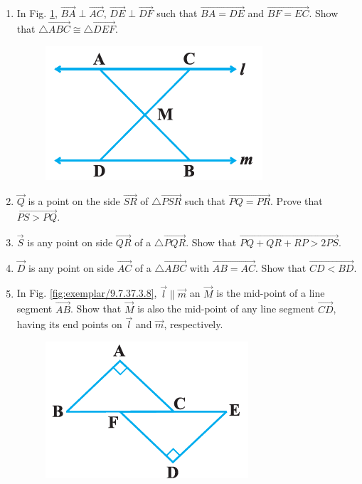 \begin{enumerate}[label=\arabic*.,ref=\thesubsection.\theenumi]
\begin{figure}[h]
\end{figure}
\item In Fig. \ref{fig:exemplar/9.7.37.3.4}, $\vec{BA} \perp \vec{AC}$, $\vec{DE} \perp \vec{DF}$ such that $\vec{BA=DE}$ and $\vec{BF=EC}$. Show that $\triangle \vec{ABC} \cong \triangle \vec{DEF}$.
\begin{figure}[h]
	\centering
	\includegraphics[width=\columnwidth]{chapters/exemplar/9.7.3/figs/Figure3.png}
	\caption{}
	\label{fig:exemplar/9.7.37.3.4}
\end{figure}
\item $\vec{Q}$ is a point on the side $\vec{SR}$ of $\triangle \vec{PSR}$ such that $\vec{PQ=PR}$. Prove that $\vec{PS>PQ}$.
\item $\vec{S}$ is any point on side $\vec{QR}$ of a $\triangle \vec{PQR}$. Show that $\vec{PQ+QR+RP>2PS}$.
\item $\vec{D}$ is any point on side $\vec{AC}$ of a $\triangle \vec{ABC}$ with $\vec{AB=AC}$. Show that $\vec{CD<BD}$.
\item In Fig. \ref{fig:exemplar/9.7.37.3.8}, $\vec{l} \| \vec{m}$ an $\vec{M}$ is the mid-point of a line segment $\vec{AB}$. Show that $\vec{M}$ is also the mid-point of any line segment $\vec{CD}$, having its end points on $\vec{l}$ and $\vec{m}$, respectively.
\begin{figure}[h]
	\centering
	\includegraphics[width=\columnwidth]{chapters/exemplar/9.7.3/figs/Figure4.png}

\end{figure}
\end{enumerate}
